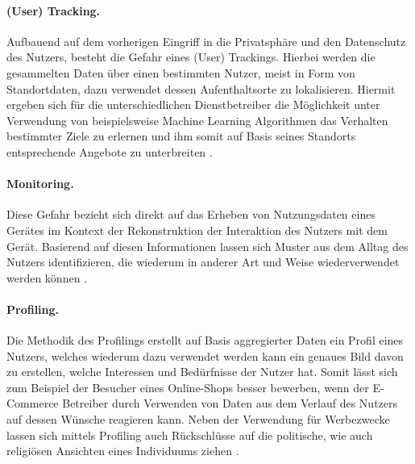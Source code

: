 \paragraph{(User) Tracking.}
\label{sec:Grundlagen:para:User Tracking}
Aufbauend auf dem vorherigen Eingriff in die Privatsphäre und den Datenschutz des Nutzers, besteht die Gefahr eines (User) Trackings. Hierbei werden die gesammelten Daten über einen bestimmten Nutzer, meist in Form von Standortdaten, dazu verwendet dessen Aufenthaltsorte zu lokalisieren. Hiermit ergeben sich für die unterschiedlichen Dienstbetreiber die Möglichkeit unter Verwendung von beispielsweise Machine Learning Algorithmen das Verhalten bestimmter Ziele zu erlernen und ihm somit auf Basis seines Standorts entsprechende Angebote zu unterbreiten \cite{Seliem2018}.


\paragraph{Monitoring.}
\label{sec:Grundlagen:para:Monitoring}
Diese Gefahr bezieht sich direkt auf das Erheben von Nutzungsdaten eines Gerätes im Kontext der Rekonstruktion der Interaktion des Nutzers mit dem Gerät. Basierend auf diesen Informationen lassen sich Muster aus dem Alltag des Nutzers identifizieren, die wiederum in anderer Art und Weise wiederverwendet werden können \cite{Seliem2018}.


\paragraph{Profiling.}
\label{sec:Grundlagen:para:Profiling}
Die Methodik des Profilings erstellt auf Basis aggregierter Daten ein Profil eines Nutzers, welches wiederum dazu verwendet werden kann ein genaues Bild davon zu erstellen, welche Interessen und Bedürfnisse der Nutzer hat. Somit lässt sich zum Beispiel der Besucher eines Online-Shops besser bewerben, wenn der E-Commerce Betreiber durch Verwenden von Daten aus dem Verlauf des Nutzers auf dessen Wünsche reagieren kann. Neben der Verwendung für Werbezwecke lassen sich mittels Profiling auch Rückschlüsse auf die politische, wie auch religiösen Ansichten eines Individuums ziehen \cite{Seliem2018}.

